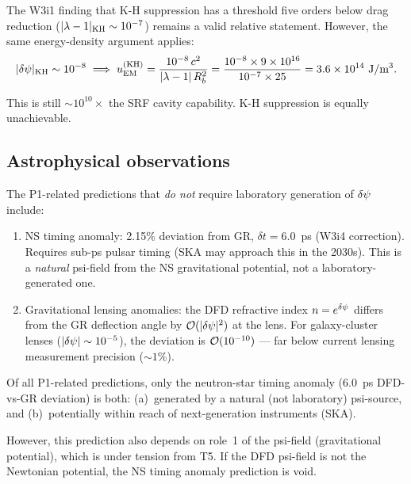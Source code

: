 The W3i1 finding that K-H suppression has a threshold five orders below
drag reduction ($|\lambda - 1|_{\rm KH} \sim 10^{-7}$) remains a valid relative
statement. However, the same energy-density argument applies:
\begin{equation}
|\delta\psi|_{\rm KH} \sim 10^{-8} \implies u_{\rm EM}^{(\rm KH)}
= \frac{10^{-8}\,c^2}{|\lambda - 1|\,R_b^2}
= \frac{10^{-8} \times 9\times 10^{16}}{10^{-7} \times 25}
= 3.6\times 10^{14}~\text{J/m$^3$}.
\label{eq:KH_energy}
\end{equation}

This is still $\sim 10^{10}\times$ the SRF cavity capability.
K-H suppression is equally unachievable.

\subsection{Astrophysical observations}
\label{ssec:astro}

The P1-related predictions that \emph{do not} require laboratory generation
of $\delta\psi$ include:
\begin{enumerate}[nosep]
\item NS timing anomaly: 2.15\% deviation from GR, $\delta t = 6.0$~ps (W3i4
  correction). Requires sub-ps pulsar timing (SKA may approach this in the
  2030s). This is a \emph{natural} psi-field from the NS gravitational
  potential, not a laboratory-generated one.
\item Gravitational lensing anomalies: the DFD refractive index $n = e^{\delta\psi}$
  differs from the GR deflection angle by $\mathcal{O}(|\delta\psi|^2)$ at the lens.
  For galaxy-cluster lenses ($|\delta\psi| \sim 10^{-5}$), the deviation is
  $\mathcal{O}(10^{-10})$ --- far below current lensing measurement precision
  ($\sim 1\%$).
\end{enumerate}

\begin{finding}
\label{find:NS_survives}
Of all P1-related predictions, only the neutron-star timing anomaly (6.0~ps
DFD-vs-GR deviation) is both:
(a)~generated by a natural (not laboratory) psi-source, and
(b)~potentially within reach of next-generation instruments (SKA).

However, this prediction also depends on role~1 of the psi-field
(gravitational potential), which is under tension from T5. If the DFD
psi-field is not the Newtonian potential, the NS timing anomaly prediction
is void.
\end{finding}

